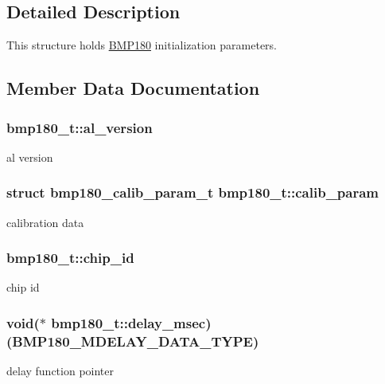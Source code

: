 \subsection{Detailed Description}
This structure holds \hyperlink{classBMP180}{B\+M\+P180} initialization parameters. 

\subsection{Member Data Documentation}
\subsubsection[{\texorpdfstring{al\+\_\+version}{al_version}}]{ bmp180\+\_\+t\+::al\+\_\+version}\hypertarget{structbmp180__t_aef41548b2ff2ff3cc7db7984cace6918}{}\label{structbmp180__t_aef41548b2ff2ff3cc7db7984cace6918}
al version 
\subsubsection[{\texorpdfstring{calib\+\_\+param}{calib_param}}]{\setlength{\rightskip}{0pt plus 5cm}struct {\bf bmp180\+\_\+calib\+\_\+param\+\_\+t} bmp180\+\_\+t\+::calib\+\_\+param}\hypertarget{structbmp180__t_af9052e0c95ba7c63157703465ff14ef1}{}\label{structbmp180__t_af9052e0c95ba7c63157703465ff14ef1}
calibration data 
\subsubsection[{\texorpdfstring{chip\+\_\+id}{chip_id}}]{ bmp180\+\_\+t\+::chip\+\_\+id}\hypertarget{structbmp180__t_af41f334824c5e9e6d0bb72507a734dec}{}\label{structbmp180__t_af41f334824c5e9e6d0bb72507a734dec}
chip id 
\subsubsection[{\texorpdfstring{delay\+\_\+msec}{delay_msec}}]{\setlength{\rightskip}{0pt plus 5cm}void($\ast$ bmp180\+\_\+t\+::delay\+\_\+msec) ({\bf B\+M\+P180\+\_\+\+M\+D\+E\+L\+A\+Y\+\_\+\+D\+A\+T\+A\+\_\+\+T\+Y\+PE})}\hypertarget{structbmp180__t_ad6875c8bcf81da576a90decbdf0f2a93}{}\label{structbmp180__t_ad6875c8bcf81da576a90decbdf0f2a93}
delay function pointer 
